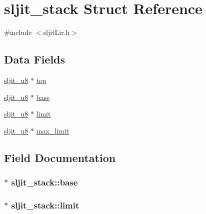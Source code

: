 \hypertarget{structsljit__stack}{}\section{sljit\+\_\+stack Struct Reference}
\label{structsljit__stack}


{\ttfamily \#include $<$sljit\+Lir.\+h$>$}

\subsection*{Data Fields}
\begin{DoxyCompactItemize}
\item 
\hyperlink{sljitConfigInternal_8h_a571cc542f404bfc97d5499bda583c5ee}{sljit\+\_\+u8} $\ast$ \hyperlink{structsljit__stack_ae1b34e23f0145d03485439289cbe6da1}{top}
\item 
\hyperlink{sljitConfigInternal_8h_a571cc542f404bfc97d5499bda583c5ee}{sljit\+\_\+u8} $\ast$ \hyperlink{structsljit__stack_a80f7ec9b33efebf2319535d3afff53f5}{base}
\item 
\hyperlink{sljitConfigInternal_8h_a571cc542f404bfc97d5499bda583c5ee}{sljit\+\_\+u8} $\ast$ \hyperlink{structsljit__stack_ab76f272c0725ccb81f2ddacf210a0c52}{limit}
\item 
\hyperlink{sljitConfigInternal_8h_a571cc542f404bfc97d5499bda583c5ee}{sljit\+\_\+u8} $\ast$ \hyperlink{structsljit__stack_aa1676902c490e26bc4f9d545cba7940b}{max\+\_\+limit}
\end{DoxyCompactItemize}


\subsection{Field Documentation}
\subsubsection[{\texorpdfstring{base}{base}}]{$\ast$ sljit\+\_\+stack\+::base}\hypertarget{structsljit__stack_a80f7ec9b33efebf2319535d3afff53f5}{}\label{structsljit__stack_a80f7ec9b33efebf2319535d3afff53f5}
\subsubsection[{\texorpdfstring{limit}{limit}}]{$\ast$ sljit\+\_\+stack\+::limit}\hypertarget{structsljit__stack_ab76f272c0725ccb81f2ddacf210a0c52}{}\label{structsljit__stack_ab76f272c0725ccb81f2ddacf210a0c52}
